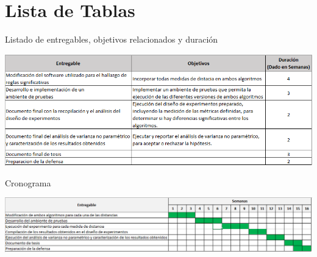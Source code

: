 \section{Lista de Tablas}
\begin{table}[h]
\caption{Listado de entregables, objetivos relacionados y duraci\'on}
\label{arm:tabla}
\begin{center}
\includegraphics[scale=0.7]{deliverables.png}\\
\end{center}
\end{table}
\begin{table}[h]
\caption{Cronograma}
\label{arm:tabla}
\begin{center}
\includegraphics[scale=0.62]{projectPlan.png}\\
\end{center}
\end{table}
\clearpage
\newpage
